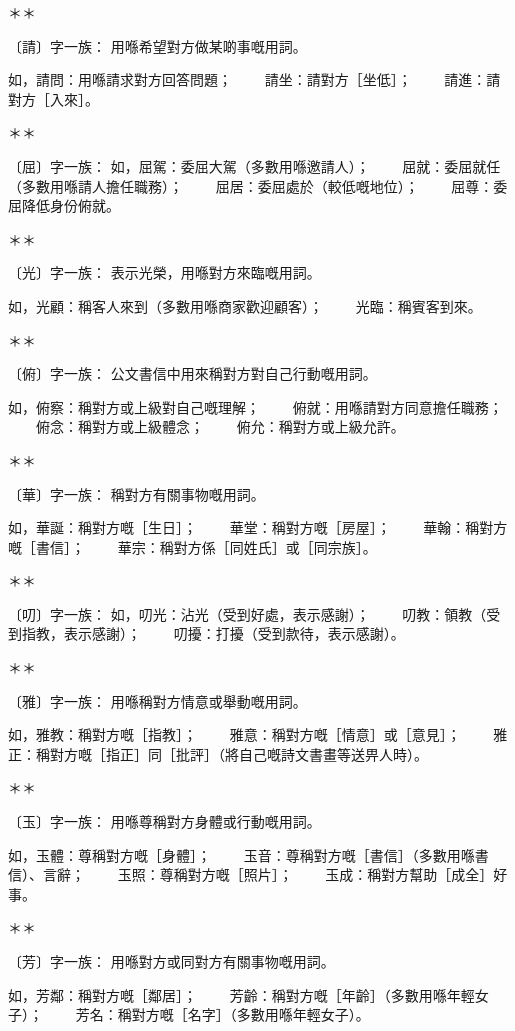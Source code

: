 ＊＊  
  
〔請〕字一族：  
用喺希望對方做某啲事嘅用詞。

如，請問：用喺請求對方回答問題；  
　　請坐：請對方［坐低］；  
　　請進：請對方［入來］。  
  
＊＊  
  
〔屈〕字一族：  
如，屈駕：委屈大駕（多數用喺邀請人）；  
　　屈就：委屈就任（多數用喺請人擔任職務）；  
　　屈居：委屈處於（較低嘅地位）；  
　　屈尊：委屈降低身份俯就。  
  
＊＊  
  
〔光〕字一族：  
表示光榮，用喺對方來臨嘅用詞。

如，光顧：稱客人來到（多數用喺商家歡迎顧客）；  
　　光臨：稱賓客到來。  
  
＊＊  
  
〔俯〕字一族：  
公文書信中用來稱對方對自己行動嘅用詞。

如，俯察：稱對方或上級對自己嘅理解；  
　　俯就：用喺請對方同意擔任職務；  
　　俯念：稱對方或上級體念；  
　　俯允：稱對方或上級允許。  
  
＊＊  
  
〔華〕字一族：  
稱對方有關事物嘅用詞。

如，華誕：稱對方嘅［生日］；  
　　華堂：稱對方嘅［房屋］；  
　　華翰：稱對方嘅［書信］；  
　　華宗：稱對方係［同姓氏］或［同宗族］。  
  
＊＊  
  
〔叨〕字一族：  
如，叨光：沾光（受到好處，表示感謝）；  
　　叨教：領教（受到指教，表示感謝）；  
　　叨擾：打擾（受到款待，表示感謝）。  
  
＊＊  
  
〔雅〕字一族：  
用喺稱對方情意或舉動嘅用詞。

如，雅教：稱對方嘅［指教］；  
　　雅意：稱對方嘅［情意］或［意見］；  
　　雅正：稱對方嘅［指正］同［批評］（將自己嘅詩文書畫等送畀人時）。  
  
＊＊  
  
〔玉〕字一族：  
用喺尊稱對方身體或行動嘅用詞。

如，玉體：尊稱對方嘅［身體］；  
　　玉音：尊稱對方嘅［書信］（多數用喺書信）、言辭；  
　　玉照：尊稱對方嘅［照片］；  
　　玉成：稱對方幫助［成全］好事。  
  
＊＊  
  
〔芳〕字一族：  
用喺對方或同對方有關事物嘅用詞。

如，芳鄰：稱對方嘅［鄰居］；  
　　芳齡：稱對方嘅［年齡］（多數用喺年輕女子）；  
　　芳名：稱對方嘅［名字］（多數用喺年輕女子）。  
  

